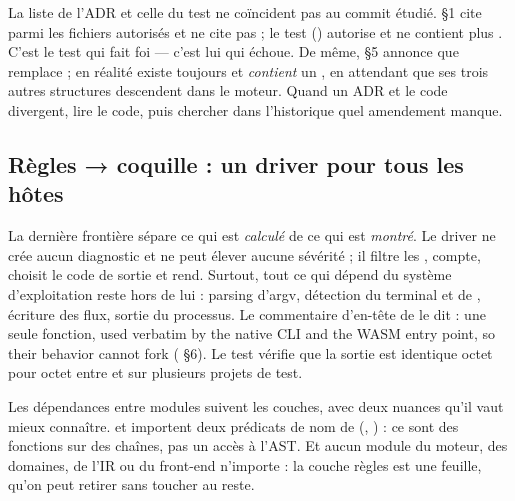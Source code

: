 \begin{piege}
La liste de l'ADR et celle du test ne coïncident pas au commit étudié.  §1 cite  parmi les fichiers autorisés et ne cite pas  ; le test () autorise  et ne contient plus . C'est le test qui fait foi --- c'est lui qui échoue. De même,  §5 annonce que  \og remplace\fg{}  ; en réalité  existe toujours et \emph{contient} un , en attendant que ses trois autres structures descendent dans le moteur. Quand un ADR et le code divergent, lire le code, puis chercher dans l'historique quel amendement manque.
\end{piege}

\subsection{Règles → coquille : un driver pour tous les hôtes}

La dernière frontière sépare ce qui est \emph{calculé} de ce qui est \emph{montré}. Le driver ne crée aucun diagnostic et ne peut élever aucune sévérité ; il filtre les \Info{}, compte, choisit le code de sortie et rend. Surtout, tout ce qui dépend du système d'exploitation reste hors de lui : parsing d'argv, détection du terminal et de , écriture des flux, sortie du processus. Le commentaire d'en-tête de  le dit : une seule fonction, \og used verbatim by the native CLI and the WASM entry point, so their behavior cannot fork\fg{} ( §6). Le test  vérifie que la sortie est identique octet pour octet entre  et  sur plusieurs projets de test.

\begin{remarque}
Les dépendances entre modules suivent les couches, avec deux nuances qu'il vaut mieux connaître.  et  importent deux prédicats de nom de  (, ) : ce sont des fonctions sur des chaînes, pas un accès à l'AST. Et aucun module du moteur, des domaines, de l'IR ou du front-end n'importe  : la couche règles est une feuille, qu'on peut retirer sans toucher au reste.
\end{remarque}

